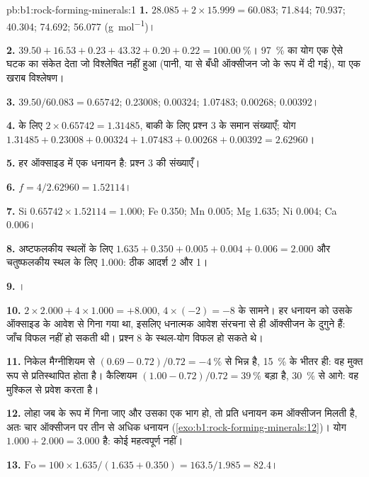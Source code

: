 \begin{solution}{pb:b1:rock-forming-minerals:1}
\textbf{1.}  $28.085 + 2\times15.999 = 60.083$;  71.844;
 70.937;  40.304;  74.692;  56.077
(\si{g.mol^{-1}})।

\textbf{2.} $39.50 + 16.53 + 0.23 + 43.32 + 0.20 + 0.22 =
\qty{100.00}{\percent}$। \qty{97}{\percent} का योग एक ऐसे घटक का संकेत देता जो विश्लेषित नहीं हुआ (पानी, या
 से बँधी ऑक्सीजन जो  के रूप में दी गई), या एक खराब विश्लेषण।

\textbf{3.}  $39.50/60.083 = 0.65742$;  0.23008; 
0.00324;  1.07483;  0.00268;  0.00392।

\textbf{4.}  के लिए $2\times0.65742 = 1.31485$, बाकी के लिए प्रश्न 3 के समान संख्याएँ; योग $1.31485 + 0.23008 + 0.00324 + 1.07483 +
0.00268 + 0.00392 = 2.62960$।

\textbf{5.} हर ऑक्साइड में एक धनायन है: प्रश्न 3 की संख्याएँ।

\textbf{6.} $f = 4/2.62960 = 1.52114$।

\textbf{7.} Si $0.65742\times1.52114 = 1.000$; Fe 0.350; Mn 0.005; Mg 1.635;
Ni 0.004; Ca 0.006।

\textbf{8.} अष्टफलकीय स्थलों के लिए $1.635 + 0.350 + 0.005 + 0.004 + 0.006 = 2.000$ और चतुष्फलकीय स्थल के लिए 1.000: ठीक
आदर्श 2 और 1।

\textbf{9.} ।

\textbf{10.} $2\times2.000 + 4\times1.000 = +8.000$, $4\times(-2) =
-8$ के सामने। हर धनायन को उसके ऑक्साइड के आवेश से गिना गया था, इसलिए धनात्मक आवेश संरचना से ही ऑक्सीजन के दुगुने
हैं: जाँच विफल नहीं हो सकती थी। प्रश्न 8 के स्थल-योग विफल हो सकते थे।

\textbf{11.} निकेल मैग्नीशियम से
$(0.69 - 0.72)/0.72 = -\qty{4}{\percent}$ से भिन्न है, \qty{15}{\percent} के भीतर ही: वह मुक्त रूप से
प्रतिस्थापित होता है। कैल्शियम $(1.00 - 0.72)/0.72 = \qty{39}{\percent}$ बड़ा है, \qty{30}{\percent} से आगे: वह मुश्किल से प्रवेश करता है।

\textbf{12.} लोहा जब  के रूप में गिना जाए और उसका एक भाग  हो, तो प्रति धनायन कम ऑक्सीजन
मिलती है, अतः चार ऑक्सीजन पर तीन से अधिक धनायन
(\cref{exo:b1:rock-forming-minerals:12})। योग $1.000 + 2.000 = 3.000$ है: कोई महत्वपूर्ण  नहीं।

\textbf{13.} $\mathrm{Fo} = 100\times1.635/(1.635 + 0.350) = 163.5/1.985 =
82.4$।


\end{solution}
